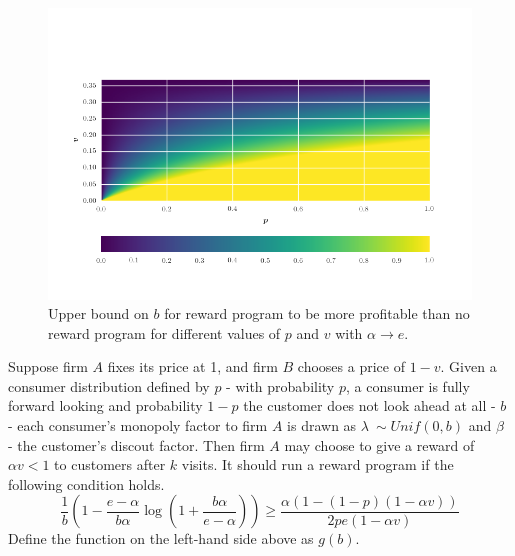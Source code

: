 \begin{figure}[h!]
\begin{centering}
\includegraphics[scale = 0.75]{./figures/b_restriction.png}
\caption{Upper bound on $b$ for reward program to be more profitable than no reward program for different values of $p$ and $v$ with $\alpha \rightarrow e$.}
\label{fig:b_restriction}
\end{centering}
\end{figure}

\begin{theorem}
Suppose firm $A$ fixes its price at 1, and firm $B$ chooses a price of $1-v$. Given a consumer distribution defined by $p$ - with probability $p$, a consumer is fully forward looking and probability $1-p$ the customer does not look ahead at all - $b$ - each consumer's monopoly factor to firm $A$ is drawn as $\lambda~\sim Unif(0,b)$ and $\beta$ - the customer's discout factor. Then firm $A$ may choose to give a reward of $\alpha v < 1$ to customers after $k$ visits. It should run a reward program if the following condition holds.
\begin{equation}
\frac{1}{b}\left(1-\frac{e-\alpha}{b\alpha}\log \left(1+\frac{b\alpha}{e-\alpha} \right) \right) \geq \frac{\alpha(1-(1-p)(1-\alpha v))}{2pe(1-\alpha v)}
\end{equation}
Define the function on the left-hand side above as $g(b)$.
\end{theorem}

